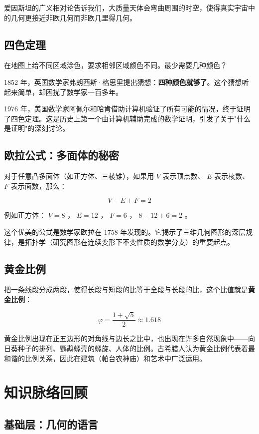 爱因斯坦的广义相对论告诉我们，大质量天体会弯曲周围的时空，使得真实宇宙中的几何更接近非欧几何而非欧几里得几何。

\subsection*{四色定理}


在地图上给不同区域涂色，要求相邻区域颜色不同。最少需要几种颜色？

1852 年，英国数学家弗朗西斯·格思里提出猜想：\textbf{四种颜色就够了}。这个猜想听起来简单，却困扰了数学家一百多年。

1976 年，美国数学家阿佩尔和哈肯借助计算机验证了所有可能的情况，终于证明了四色定理。这是历史上第一个由计算机辅助完成的数学证明，引发了关于"什么是证明"的深刻讨论。

\subsection*{欧拉公式：多面体的秘密}


对于任意凸多面体（如正方体、三棱锥），如果用 $V$ 表示顶点数、 $E$ 表示棱数、 $F$ 表示面数，那么：

\[
V - E + F = 2
\]


例如正方体： $V = 8$ ， $E = 12$ ， $F = 6$ ， $8 - 12 + 6 = 2$ 。

这个优美的公式是数学家欧拉在 1758 年发现的。它揭示了三维几何图形的深层规律，是拓扑学（研究图形在连续变形下不变性质的数学分支）的重要起点。

\subsection*{黄金比例}


把一条线段分成两段，使得长段与短段的比等于全段与长段的比，这个比值就是\textbf{黄金比例}：

\[
\varphi = \frac{1 + \sqrt{5}}{2} \approx 1.618
\]


黄金比例出现在正五边形的对角线与边长之比中，也出现在许多自然现象中——向日葵种子的排列、鹦鹉螺壳的螺旋、人体的比例。古希腊人认为黄金比例代表着最和谐的比例关系，因此在建筑（帕台农神庙）和艺术中广泛运用。



\section*{知识脉络回顾}


\subsection*{基础层：几何的语言}


